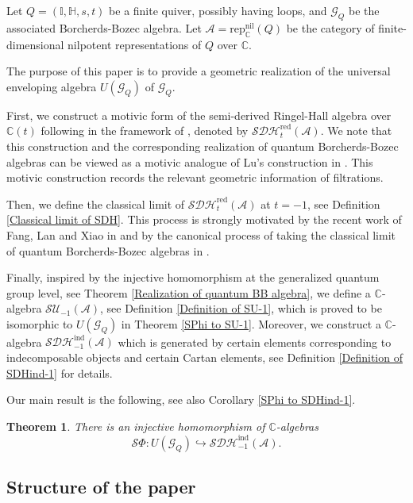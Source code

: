\documentclass[12pt]{amsart}
\newtheorem{theorem}{Theorem}[section]
\theoremstyle{definition}
\numberwithin{equation}{section}
\begin{document}
Let $ Q=(\mathbb{I},\mathbb{H},s,t) $ be a finite quiver, possibly having loops, and $ \mathcal{G}_Q $ be the associated Borcherds-Bozec algebra. 
Let $ \mathcal{A}= \mathrm{rep}^{\mathrm{nil}}_{\mathbb{C}}(Q) $ be the category of finite-dimensional nilpotent representations of $ Q $ over $ \mathbb{C} $. 

The purpose of this paper is to provide a geometric realization of the universal enveloping algebra $ U(\mathcal{G}_Q) $ of $ \mathcal{G}_Q $. 

First, we construct a motivic form of the semi-derived Ringel-Hall algebra over $ \mathbb{C}(t) $ following \cite{LP21} in the framework of \cite{Joyce07}, denoted by $ \mathcal{SDH}_t^{\mathrm{red}}(\mathcal{A}) $. 
We note that this construction and the corresponding realization of quantum Borcherds-Bozec algebras can be viewed as a motivic analogue of Lu's construction in \cite{L23}. 
This motivic construction records the relevant geometric information of filtrations. 

Then, we define the classical limit of $ \mathcal{SDH}_t^{\mathrm{red}}(\mathcal{A}) $ at $ t=-1 $, see Definition \ref{Classical limit of SDH}. 
This process is strongly motivated by the recent work of Fang, Lan and Xiao in \cite{FLX24} and by the canonical process of taking the classical limit of quantum Borcherds-Bozec algebras in \cite{FKKB21}. 

Finally, inspired by the injective homomorphism at the generalized quantum group level, see Theorem \ref{Realization of quantum BB algebra}, we define a $ \mathbb{C} $-algebra $ \mathcal{SU}_{-1}(\mathcal{A}) $, see Definition \ref{Definition of SU-1}, which is proved to be isomorphic to $ U(\mathcal{G}_Q) $ in Theorem \ref{SPhi to SU-1}. 
Moreover, we construct a $ \mathbb{C} $-algebra $ \mathcal{SDH}_{-1}^{\mathrm{ind}}(\mathcal{A}) $ which is generated by certain elements corresponding to indecomposable objects and certain Cartan elements, see Definition \ref{Definition of SDHind-1} for details. 

Our main result is the following, see also Corollary \ref{SPhi to SDHind-1}. 

\begin{theorem}
    \label{First main result}
    There is an injective homomorphism of $ \mathbb{C} $-algebras
    \[ \mathcal{S}\Phi: U(\mathcal{G}_Q) \hookrightarrow \mathcal{SDH}^{\mathrm{ind}}_{-1}(\mathcal{A}). \] 
\end{theorem}

\subsection{Structure of the paper}\;
\end{document}
